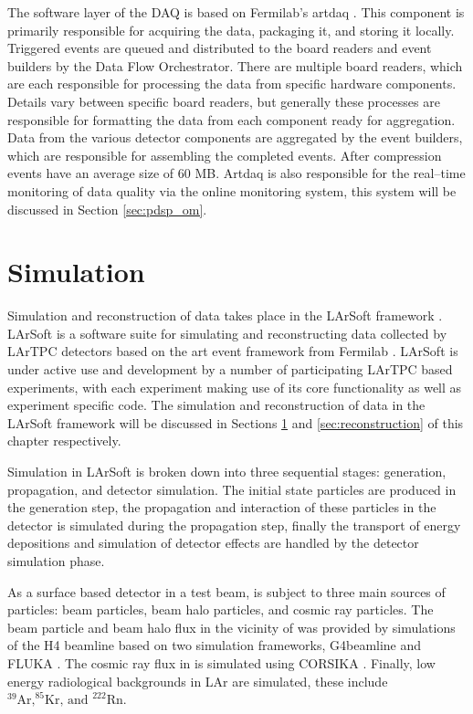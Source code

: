 The software layer of the \protodune{} DAQ is based on Fermilab's artdaq 
\cite{6495515}. This component is primarily responsible for acquiring the data,
packaging it, and storing it locally. Triggered events are queued and 
distributed to the board readers and event builders by the Data Flow 
Orchestrator. There are multiple board readers, which are each responsible for 
processing the data from specific hardware components. Details vary between 
specific board readers, but generally these processes are responsible for 
formatting the data from each component ready for aggregation. Data from the
various detector components are aggregated by the event builders, which are
responsible for assembling the completed events. After compression events have
an average size of 60 MB. Artdaq is also responsible for the real--time 
monitoring of data quality via the online monitoring system, this system will be
discussed in Section \ref{sec:pdsp_om}.

\section{Simulation} \label{sec:simulation}

Simulation and reconstruction of \protodune{} data takes place in the LArSoft
framework \cite{Snider2017}. LArSoft is a software suite for simulating and
reconstructing data collected by LArTPC detectors based on the art event 
framework from Fermilab \cite{Green:2012gv}. LArSoft is under active use and
development by a number of participating LArTPC based experiments, with each
experiment making use of its core functionality as well as experiment specific
code. The simulation and reconstruction of \protodune{} data in the LArSoft
framework will be discussed in Sections \ref{sec:simulation} and
\ref{sec:reconstruction} of this chapter respectively.

Simulation in LArSoft is broken down into three sequential stages: generation,
propagation, and detector simulation. The initial state particles are produced
in the generation step, the propagation and interaction of these particles in
the detector is simulated during the propagation step, finally the transport of 
energy depositions and simulation of detector effects are handled by the
detector simulation phase.

As a surface based detector in a test beam, \protodune{} is subject to three
main sources of particles: beam particles, beam halo particles, and cosmic ray
particles. The beam particle and beam halo flux in the vicinity of 
\protodune{} was provided by simulations of the H4 beamline 
\cite{Booth:2019brj} based on two simulation frameworks, G4beamline 
\cite{g4beamline} and FLUKA \cite{BOHLEN2014211}. The cosmic ray flux in
\protodune{} is simulated using CORSIKA \cite{Heck:1998vt}. Finally, low energy 
radiological backgrounds in LAr are simulated, these include $^{39}\mbox{Ar,} ^
{85}\mbox{Kr, and } ^{222}\mbox{Rn}$.


